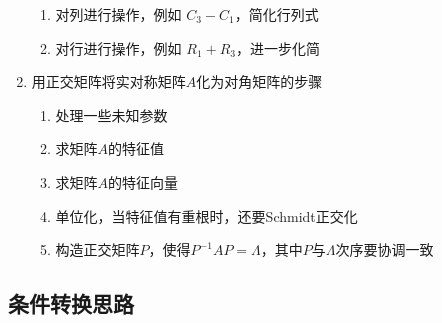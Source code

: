 \documentclass[a4paper,12pt]{article}
\begin{document}
\begin{enumerate}
\begin{enumerate}
            \item 对列进行操作，例如 $C_3 - C_1$，简化行列式
            \item 对行进行操作，例如 $R_1 + R_3$，进一步化简
        \end{enumerate}
        \item 用正交矩阵将实对称矩阵$A$化为对角矩阵的步骤
        \begin{enumerate}
            \item 处理一些未知参数
            \item 求矩阵$A$的特征值
            \item 求矩阵$A$的特征向量
            \item 单位化，当特征值有重根时，{\color[rgb]{0.2, 0.6, 0.3}{可能}}还要Schmidt正交化
            \item 构造正交矩阵$P$，使得$P^{-1}AP = \Lambda$，其中$P$与$\Lambda$次序要协调一致
        \end{enumerate}
    \end{enumerate}

    \subsection{条件转换思路}
\end{document}
